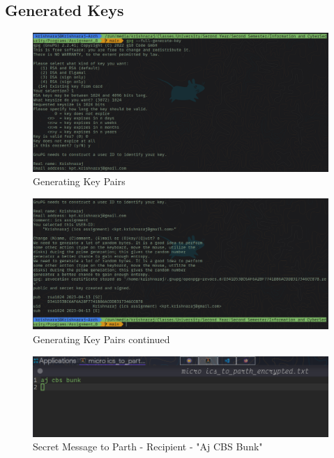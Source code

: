 \documentclass[openany]{book}
\begin{document}
\subsection{Generated Keys}





\begin{figure}[H]
    \centering
    \includegraphics[width=1\textwidth]{../Programs/Assignment_8/Screenshot_on_2023-04-13_at_12-28-59.png}
    \caption{Generating Key Pairs}
\end{figure}
\begin{figure}[H]
    \centering
    \includegraphics[width=.99\textwidth]{../Programs/Assignment_8/Screenshot_on_2023-04-13_at_12-29-06.png}
    \caption{Generating Key Pairs continued}
\end{figure}
\begin{figure}[H]
    \centering
    \includegraphics[width=.99\textwidth]{../Programs/Assignment_8/Screenshot_on_2023-04-13_at_12-29-34.png}
    \caption{Secret Message to Parth - Recipient - "Aj CBS Bunk"}
\end{figure}
\end{document}
